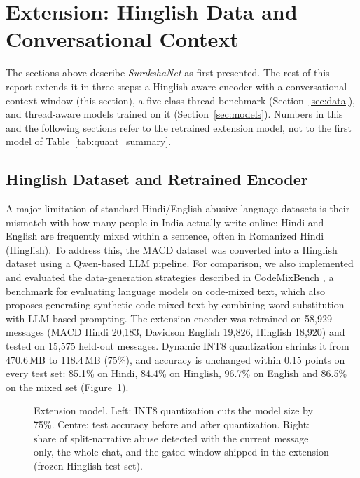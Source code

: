 \documentclass[sigconf,9pt]{acmart}
\begin{document}
\section{Extension: Hinglish Data and Conversational Context}
The sections above describe \textit{SurakshaNet} as first presented. The rest of this report extends it in three steps: a Hinglish-aware encoder with a conversational-context window (this section), a five-class thread benchmark (Section~\ref{sec:data}), and thread-aware models trained on it (Section~\ref{sec:models}). Numbers in this and the following sections refer to the retrained extension model, not to the first model of Table~\ref{tab:quant_summary}.

\subsection{Hinglish Dataset and Retrained Encoder}
A major limitation of standard Hindi/English abusive-language datasets is their mismatch with how many people in India actually write online: Hindi and English are frequently mixed within a sentence, often in Romanized Hindi (Hinglish). To address this, the MACD dataset was converted into a Hinglish dataset using a Qwen-based LLM pipeline. For comparison, we also implemented and evaluated the data-generation strategies described in CodeMixBench \cite{yang-chai-2025-codemixbench}, a benchmark for evaluating language models on code-mixed text, which also proposes generating synthetic code-mixed text by combining word substitution with LLM-based prompting. The extension encoder was retrained on 58{,}929 messages (MACD Hindi 20{,}183, Davidson English 19{,}826, Hinglish 18{,}920) and tested on 15{,}575 held-out messages. Dynamic INT8 quantization shrinks it from 470.6\,MB to 118.4\,MB (75\%), and accuracy is unchanged within 0.15 points on every test set: 85.1\% on Hindi, 84.4\% on Hinglish, 96.7\% on English and 86.5\% on the mixed set (Figure~\ref{fig:results1}).

\begin{figure}[!t]
  \centering
  \resizebox{0.97\textwidth}{!}{}
  \caption{Extension model. Left: INT8 quantization cuts the model size by 75\%. Centre: test accuracy before and after quantization. Right: share of split-narrative abuse detected with the current message only, the whole chat, and the gated window shipped in the extension (frozen Hinglish test set).}
  \label{fig:results1}
\end{figure}
\end{document}
